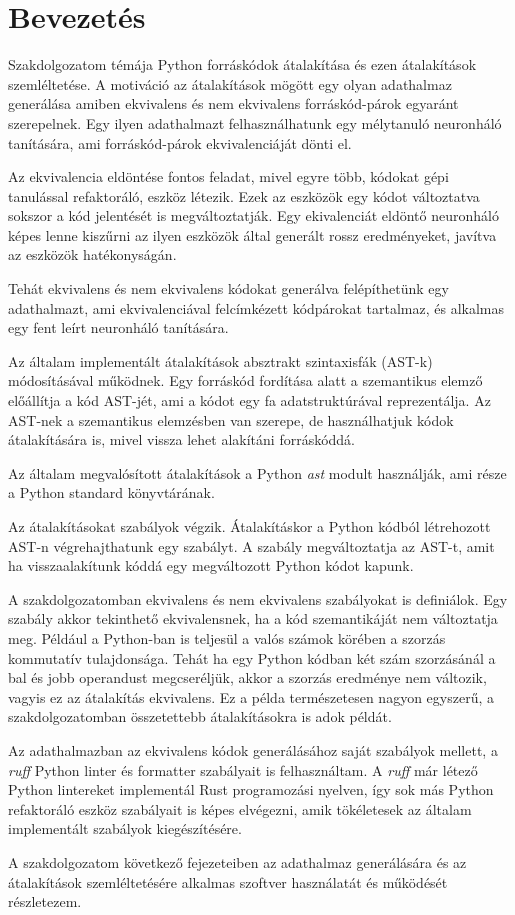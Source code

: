 \chapter{Bevezetés}
\label{ch:intro}

Szakdolgozatom témája Python forráskódok átalakítása és ezen átalakítások szemléltetése.
A motiváció az átalakítások mögött egy olyan adathalmaz generálása amiben ekvivalens és nem
ekvivalens 
forráskód-párok egyaránt szerepelnek. Egy ilyen adathalmazt felhasználhatunk egy mélytanuló
neuronháló tanítására,
ami forráskód-párok ekvivalenciáját dönti el.

Az ekvivalencia eldöntése fontos feladat, mivel egyre több, kódokat gépi tanulással refaktoráló,
eszköz létezik.
Ezek az eszközök egy kódot változtatva sokszor a kód jelentését is megváltoztatják.
Egy ekivalenciát eldöntő neuronháló képes lenne kiszűrni az ilyen eszközök által generált
rossz eredményeket, javítva az eszközök hatékonyságán.

Tehát ekvivalens és nem ekvivalens kódokat generálva felépíthetünk egy adathalmazt, ami
ekvivalenciával felcímkézett kódpárokat tartalmaz, és alkalmas egy fent leírt neuronháló
tanítására.

Az általam implementált átalakítások absztrakt szintaxisfák (AST-k) módosításával működnek.
Egy forráskód fordítása alatt a szemantikus elemző előállítja a kód AST-jét,
ami a kódot egy fa adatstruktúrával reprezentálja.
Az AST-nek a szemantikus elemzésben van szerepe,
de használhatjuk kódok átalakítására is, mivel vissza lehet alakítáni forráskóddá.

Az általam megvalósított átalakítások a Python \emph{ast} modult \cite{pythonAST} használják,
ami része a Python standard könyvtárának.

Az átalakításokat szabályok végzik. Átalakításkor 
a Python kódból létrehozott AST-n végrehajthatunk egy szabályt.
A szabály megváltoztatja az AST-t, amit ha visszaalakítunk kóddá
egy megváltozott Python kódot kapunk.

A szakdolgozatomban ekvivalens és nem ekvivalens szabályokat is definiálok.
Egy szabály akkor tekinthető ekvivalensnek, ha a kód szemantikáját nem változtatja meg.
Például a Python-ban is teljesül a valós számok körében a szorzás kommutatív tulajdonsága.
Tehát ha egy Python kódban két szám szorzásánál a bal és jobb operandust megcseréljük,
akkor a szorzás eredménye nem változik, vagyis ez az átalakítás ekvivalens.
Ez a példa természetesen nagyon egyszerű, a szakdolgozatomban összetettebb átalakításokra is
adok példát.

Az adathalmazban az ekvivalens kódok generálásához saját szabályok mellett,
a \emph{ruff} Python linter és formatter szabályait is felhasználtam.
A \emph{ruff} már létező Python lintereket implementál Rust programozási nyelven,
így sok más Python refaktoráló eszköz szabályait is képes elvégezni,
amik tökéletesek az általam implementált szabályok kiegészítésére.

A szakdolgozatom következő fejezeteiben az adathalmaz generálására és az átalakítások
szemléltetésére alkalmas szoftver használatát és működését részletezem.
